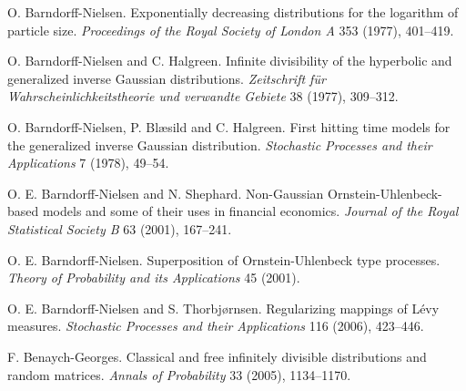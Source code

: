 
 O. Barndorff-Nielsen. Exponentially decreasing distributions for the logarithm of particle size. \emph{Proceedings of the Royal Society of London A} 353 (1977), 401--419.

 O. Barndorff-Nielsen and C. Halgreen. Infinite divisibility of the hyperbolic and generalized inverse Gaussian distributions. \emph{Zeitschrift f\"ur Wahrscheinlichkeitstheorie und verwandte Gebiete} 38 (1977), 309--312.

 O. Barndorff-Nielsen, P. Bl{\ae}sild and C. Halgreen. First hitting time models for the generalized inverse Gaussian distribution. \emph{Stochastic Processes and their Applications} 7 (1978), 49--54.

 O. E. Barndorff-Nielsen and N. Shephard. Non-Gaussian Ornstein-Uhlenbeck-based models and some of their uses in financial economics. \emph{Journal of the Royal Statistical Society B} 63 (2001), 167--241.

 O. E. Barndorff-Nielsen. Superposition of Ornstein-Uhlenbeck type processes. \emph{Theory of Probability and its Applications} 45 (2001).

 O. E. Barndorff-Nielsen and S. Thorbj{\o}rnsen. Regularizing mappings of L\'evy measures. \emph{Stochastic Processes and their Applications} 116 (2006), 423--446.

 F. Benaych-Georges. Classical and free infinitely divisible distributions and random matrices. \emph{Annals of Probability} 33 (2005), 1134--1170.

